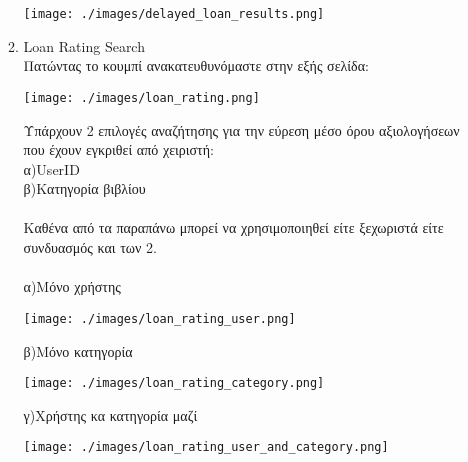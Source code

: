 \documentclass[14pt]{report}
\begin{document}
\begin{enumerate}
\begin{enumerate}
			\vspace{\baselineskip}
			
			\texttt{[image: ./images/delayed\_loan\_results.png]}
			
			\vspace{\baselineskip}
			
			\newpage
			\hypertarget{o-loan-rating}{}
			\item Loan Rating Search \\
			Πατώντας το κουμπί ανακατευθυνόμαστε στην εξής σελίδα: \\
			
			\vspace{\baselineskip}
			
			\texttt{[image: ./images/loan\_rating.png]}
			
			\vspace{\baselineskip}
			
			Υπάρχουν 2 επιλογές αναζήτησης για την εύρεση μέσο όρου αξιολογήσεων που έχουν εγκριθεί από χειριστή: \\
			α)UserID \\
			β)Κατηγορία βιβλίου \\ \\
			Καθένα από τα παραπάνω μπορεί να χρησιμοποιηθεί είτε ξεχωριστά είτε συνδυασμός και των 2. \\ \\ 
			\newpage
			α)Μόνο χρήστης \\ 
			\vspace{\baselineskip}
			
			\texttt{[image: ./images/loan\_rating\_user.png]}
			
			\vspace{\baselineskip}
			
			\newpage
			β)Μόνο κατηγορία \\
			\vspace{\baselineskip}
			
			\texttt{[image: ./images/loan\_rating\_category.png]}
			
			\vspace{\baselineskip}
			
			\newpage
			γ)Χρήστης κα κατηγορία μαζί \\
			\vspace{\baselineskip}
			
			\texttt{[image: ./images/loan\_rating\_user\_and\_category.png]}
			
			\vspace{\baselineskip}
		\end{enumerate}
	\end{enumerate}
\end{document}
